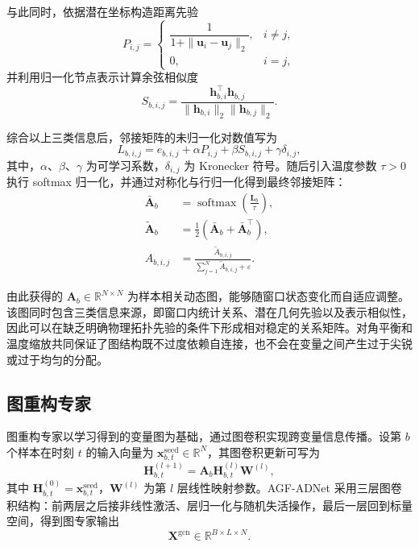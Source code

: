 与此同时，依据潜在坐标构造距离先验
\begin{equation}
    P_{i,j} =
    \begin{cases}
        \dfrac{1}{1+\|\mathbf{u}_i-\mathbf{u}_j\|_2}, & i \neq j, \\
        0, & i=j,
    \end{cases}
\end{equation}
并利用归一化节点表示计算余弦相似度
\begin{equation}
    S_{b,i,j} = \frac{\mathbf{h}_{b,i}^{\top}\mathbf{h}_{b,j}}{\|\mathbf{h}_{b,i}\|_2 \|\mathbf{h}_{b,j}\|_2}.
\end{equation}

综合以上三类信息后，邻接矩阵的未归一化对数值写为
\begin{equation}
    L_{b,i,j} = e_{b,i,j} + \alpha P_{i,j} + \beta S_{b,i,j} + \gamma \delta_{i,j},
\end{equation}
其中，$\alpha$、$\beta$、$\gamma$ 为可学习系数，$\delta_{i,j}$ 为 Kronecker 符号。随后引入温度参数 $\tau>0$ 执行 softmax 归一化，并通过对称化与行归一化得到最终邻接矩阵：
\begin{align}
    \bar{\mathbf{A}}_b &= \operatorname{softmax}\!\left(\frac{\mathbf{L}_b}{\tau}\right), \\
    \tilde{\mathbf{A}}_b &= \frac{1}{2}\left(\bar{\mathbf{A}}_b + \bar{\mathbf{A}}_b^\top\right), \\
    A_{b,i,j} &= \frac{\tilde{A}_{b,i,j}}{\sum_{j=1}^{N} \tilde{A}_{b,i,j} + \varepsilon}.
\end{align}

由此获得的 $\mathbf{A}_b \in \mathbb{R}^{N \times N}$ 为样本相关动态图，能够随窗口状态变化而自适应调整。该图同时包含三类信息来源，即窗口内统计关系、潜在几何先验以及表示相似性，因此可以在缺乏明确物理拓扑先验的条件下形成相对稳定的关系矩阵。对角平衡和温度缩放共同保证了图结构既不过度依赖自连接，也不会在变量之间产生过于尖锐或过于均匀的分配。

\subsection{图重构专家}

图重构专家以学习得到的变量图为基础，通过图卷积实现跨变量信息传播。设第 $b$ 个样本在时刻 $t$ 的输入向量为 $\mathbf{x}_{b,t}^{\mathrm{seed}} \in \mathbb{R}^{N}$，其图卷积更新可写为
\begin{equation}
    \mathbf{H}_{b,t}^{(l+1)} = \mathbf{A}_b \mathbf{H}_{b,t}^{(l)} \mathbf{W}^{(l)},
\end{equation}
其中 $\mathbf{H}_{b,t}^{(0)} = \mathbf{x}_{b,t}^{\mathrm{seed}}$，$\mathbf{W}^{(l)}$ 为第 $l$ 层线性映射参数。AGF-ADNet 采用三层图卷积结构：前两层之后接非线性激活、层归一化与随机失活操作，最后一层回到标量空间，得到图专家输出
\begin{equation}
    \mathbf{X}^{\mathrm{gcn}} \in \mathbb{R}^{B \times L \times N}.
\end{equation}

